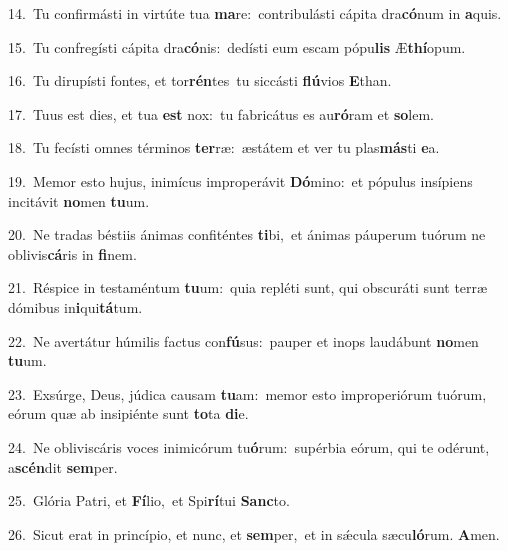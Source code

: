 {\numbfont\textcolor{\numbcolor}{14.}}~Tu confirmásti in virtúte tua \textbf{ma}\-re:~\star contribulásti cápita dra\-\textbf{có}\-num in \textbf{a}\-quis.\par
{\numbfont\textcolor{\numbcolor}{15.}}~Tu confregísti cápita dra\-\textbf{có}\-nis:~\star dedísti eum escam pópu\textbf{lis} Æ\-\textbf{thí}\-opum.\par
{\numbfont\textcolor{\numbcolor}{16.}}~Tu dirupísti fontes, et tor\-\textbf{rén}\-tes~\star tu siccásti \textbf{flú}\-vios \textbf{E}\-than.\par
{\numbfont\textcolor{\numbcolor}{17.}}~Tuus est dies, et tua \textbf{est} nox:~\star tu fabricátus es au\-\textbf{ró}\-ram et \textbf{so}\-lem.\par
{\numbfont\textcolor{\numbcolor}{18.}}~Tu fecísti omnes términos \textbf{ter}\-ræ:~\star æstátem et ver tu plas\-\textbf{más}\-ti \textbf{e}\-a.\par
{\numbfont\textcolor{\numbcolor}{19.}}~Memor esto hujus, inimícus improperávit \textbf{Dó}\-mino:~\star et pópulus insípiens incitávit \textbf{no}\-men \textbf{tu}\-um.\par
{\numbfont\textcolor{\numbcolor}{20.}}~Ne tradas béstiis ánimas confiténtes \textbf{ti}\-bi,~\star et ánimas páuperum tuórum ne oblivis\-\textbf{cá}\-ris in \textbf{fi}\-nem.\par
{\numbfont\textcolor{\numbcolor}{21.}}~Réspice in testaméntum \textbf{tu}\-um:~\star quia repléti sunt, qui obscuráti sunt terræ dómibus in\-\textbf{i}\-qui\-\textbf{tá}\-tum.\par
{\numbfont\textcolor{\numbcolor}{22.}}~Ne avertátur húmilis factus con\-\textbf{fú}\-sus:~\star pauper et inops laudábunt \textbf{no}\-men \textbf{tu}\-um.\par
{\numbfont\textcolor{\numbcolor}{23.}}~Exsúrge, Deus, júdica causam \textbf{tu}\-am:~\star memor esto improperiórum tuórum, eórum quæ ab insipiénte sunt \textbf{to}\-ta \textbf{di}\-e.\par
{\numbfont\textcolor{\numbcolor}{24.}}~Ne obliviscáris voces inimicórum tu\-\textbf{ó}\-rum:~\star supérbia eórum, qui te odérunt, a\-\textbf{scén}\-dit \textbf{sem}\-per.\par
{\numbfont\textcolor{\numbcolor}{25.}}~Glória Patri, et \textbf{Fí}\-lio,~\star et Spi\-\textbf{rí}\-tui \textbf{Sanc}\-to.\par
{\numbfont\textcolor{\numbcolor}{26.}}~Sicut erat in princípio, et nunc, et \textbf{sem}\-per,~\star et in sǽcula sæcu\-\textbf{ló}\-rum. \textbf{A}\-men.\par
